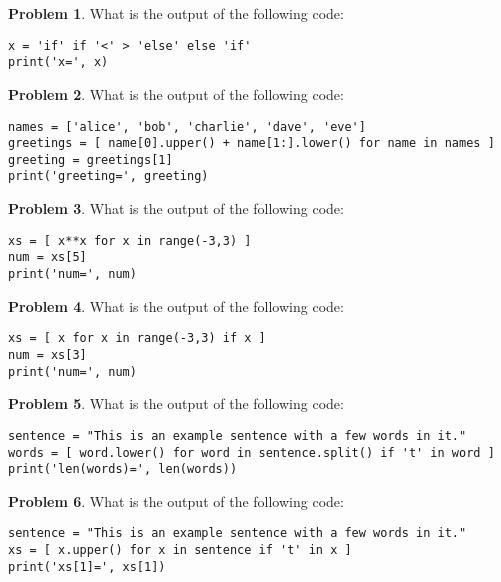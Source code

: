 \documentclass[10pt]{article}
\theoremstyle{definition}
\newtheorem{problem}{Problem}
\begin{document}
\begin{problem}
    What is the output of the following code:
\end{problem}
\begin{lstlisting}
x = 'if' if '<' > 'else' else 'if'
print('x=', x)
\end{lstlisting}
\vspace{1.5in}

\begin{problem}
    What is the output of the following code:
\end{problem}
\begin{lstlisting}
names = ['alice', 'bob', 'charlie', 'dave', 'eve']
greetings = [ name[0].upper() + name[1:].lower() for name in names ]
greeting = greetings[1]
print('greeting=', greeting)
\end{lstlisting}
\vspace{1.5in}

\begin{problem}
    What is the output of the following code:
\end{problem}
\begin{lstlisting}
xs = [ x**x for x in range(-3,3) ]
num = xs[5]
print('num=', num)
\end{lstlisting}
\vspace{1.5in}

\begin{problem}
    What is the output of the following code:
\end{problem}
\begin{lstlisting}
xs = [ x for x in range(-3,3) if x ]
num = xs[3]
print('num=', num)
\end{lstlisting}
\vspace{1.2in}


\begin{problem}
    What is the output of the following code:
\end{problem}
\begin{lstlisting}
sentence = "This is an example sentence with a few words in it."
words = [ word.lower() for word in sentence.split() if 't' in word ]
print('len(words)=', len(words))
\end{lstlisting}
\vspace{1.2in}


\begin{problem}
    What is the output of the following code:
\end{problem}
\begin{lstlisting}
sentence = "This is an example sentence with a few words in it."
xs = [ x.upper() for x in sentence if 't' in x ]
print('xs[1]=', xs[1])
\end{lstlisting}
\vspace{1.2in}
\end{document}
